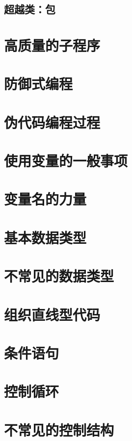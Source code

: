 \documentclass{article}
\begin{document}
\subsection{超越类：包}

\section{高质量的子程序}

\section{防御式编程}

\section{伪代码编程过程}

\section{使用变量的一般事项}

\section{变量名的力量}


\section{基本数据类型}

\section{不常见的数据类型}

\section{组织直线型代码}

\section{条件语句}

\section{控制循环}

\section{不常见的控制结构}
\end{document}
